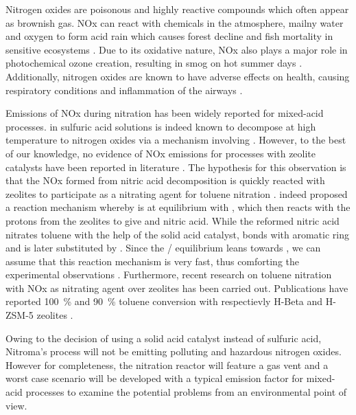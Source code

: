 Nitrogen oxides are poisonous and highly reactive compounds which often appear as brownish gas. NOx can react with chemicals in the atmosphere, mailny water and oxygen to form acid rain which causes forest decline and fish mortality in sensitive ecosystems \cite{us_epa_basic_2016}. Due to its oxidative nature, NOx also plays a major role in photochemical ozone creation, resulting in smog on hot summer days \cite{us_epa_nitrogen_nodate}. Additionally, nitrogen oxides are known to have adverse effects on  health, causing respiratory conditions and  inflammation of the airways \cite{us_epa_basic_2016}. 

Emissions of NOx during nitration has been widely reported for mixed-acid processes\cite{halder_nitration_2007,processes_research_inc_air_1972}.  in sulfuric acid solutions is indeed known to decompose at high temperature to nitrogen oxides via a mechanism involving  \cite{robertson_kinetics_1955, kazakov_kinetics_1987}. However, to the best of our knowledge, no evidence of NOx emissions for processes with zeolite catalysts have been reported in literature \cite{vassena_selective_1999,sreedhar_scientific_2013}. The hypothesis for this observation is that the NOx formed from nitric acid decomposition is quickly reacted with zeolites to participate as a nitrating agent for toluene nitration \cite{akolekar_high_1995}. \textcite{akolekar_high_1995} indeed proposed a reaction mechanism whereby  is at equilibrium with , which then reacts with the protons from the zeolites to give  and nitric acid. While the reformed nitric acid nitrates toluene with the help of the solid acid catalyst,  bonds with aromatic ring and is later substituted by . Since the / equilibrium leans towards , we can assume that this reaction mechanism is very fast, thus comforting the experimental observations \cite{university_of_texas_chapter_nodate}. Furthermore, recent research on toluene nitration with NOx as nitrating agent over zeolites has been carried out. Publications have reported \SI{100}{\percent} and \SI{90}{\percent} toluene conversion with respectievly H-Beta and H-ZSM-5 zeolites \cite{pande_nitration_2010, peng_zeolite-assisted_2001}.

Owing to the decision of using a solid acid catalyst instead of sulfuric acid, Nitroma's process will not be emitting polluting and hazardous nitrogen oxides. However for completeness, the nitration reactor will feature a gas vent and a worst case scenario will be developed with a typical emission factor for mixed-acid processes to examine the potential problems from an environmental point of view.

